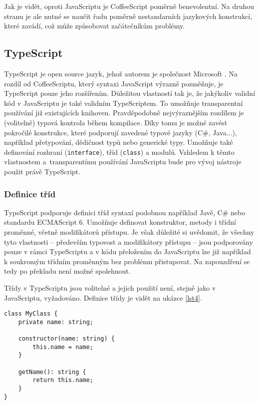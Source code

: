 Jak je vidět, oproti JavaScriptu je CoffeeScript poměrně benevolentní. Na druhou stranu je ale nutné se naučit řadu poměrně nestandarních jazykových konstrukcí, které zavádí, což může způsobovat začátečníkům problémy. 

\subsection{TypeScript}
TypeScript je open source jazyk, jehož autorem je společnost Microsoft \cite{typescript}. Na rozdíl od CoffeeScriptu, který syntaxi JavaScript výrazně pozměňuje, je TypeScript pouze jeho rozšířením. Důležitou vlastností tak je, že jakýkoliv validní kód v JavaScriptu je také validním TypeScriptem. To umožňuje transparentní používání již existujících knihoven. Pravděpodobně nejvýraznějším rozdílem je (volitelně) typová kontrola během kompilace. Díky tomu je možné zavést pokročilé konstrukce, které podporují zavedené typové jazyky (C\#, Java...), například přetypování, dědičnost typů nebo generické typy. Umožňuje také definování rozhraní (\texttt{interface}), tříd (\texttt{class}) a modulů. Vzhledem k těmto vlastnostem a~transparentímu používání JavaScriptu bude pro vývoj nástroje použit právě TypeScript.

\subsubsection{Definice tříd}
TypeScript podporuje definici tříd syntaxí podobnou například Javě, C\# nebo standardu ECMAScript 6. Umožňuje definovat konstruktor, metody i třídní proměnné, včetně modifikátorů přístupu. Je však důležité si uvědomit, že všechny tyto vlastnosti -- především typovost a modifikátory přístupu -- jsou podporovány pouze v rámci TypeScriptu a v kódu přeložením do JavaScriptu lze již například k soukromým třídním proměnným bez problému přistupovat. Na zapouzdření se tedy po překladu není možné spolehnout.

Třídy v TypeScriptu jsou volitelné a jejich použití není, stejně jako v JavaScriptu, vyžadováno. Definice třídy je vidět na ukázce \ref{lst4}.

\begin{lstlisting}[float,floatplacement=h,caption={Definice třídy v TypeScriptu},label=lst4]
class MyClass {
    private name: string;

    constructor(name: string) {
        this.name = name;
    }
    
    getName(): string {
        return this.name;
    }
}
\end{lstlisting}

